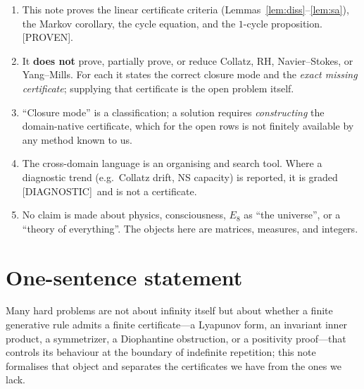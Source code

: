 \documentclass[11pt]{article}
\theoremstyle{definition}
\theoremstyle{plain}
\theoremstyle{remark}
\newcommand{\PROVEN}{\textcolor{green!45!black}{\textsf{[PROVEN]}}}
\newcommand{\DIAG}{\textcolor{blue!55!black}{\textsf{[DIAGNOSTIC]}}}
\begin{document}
\begin{enumerate}[leftmargin=1.6em]
\item This note proves the linear certificate criteria
(Lemmas~\ref{lem:diss}--\ref{lem:sa}), the Markov corollary, the cycle equation, and the
$1$-cycle proposition. \PROVEN.
\item It \textbf{does not} prove, partially prove, or reduce Collatz, RH, Navier--Stokes,
or Yang--Mills. For each it states the correct closure mode and the \emph{exact missing
certificate}; supplying that certificate is the open problem itself.
\item ``Closure mode'' is a classification; a solution requires \emph{constructing} the
domain-native certificate, which for the open rows is not finitely available by any
method known to us.
\item The cross-domain language is an organising and search tool. Where a diagnostic
trend (e.g.\ Collatz drift, NS capacity) is reported, it is graded \DIAG\ and is not a
certificate.
\item No claim is made about physics, consciousness, $E_8$ as ``the universe'', or a
``theory of everything''. The objects here are matrices, measures, and integers.
\end{enumerate}

\section*{One-sentence statement}
\noindent Many hard problems are not about infinity itself but about whether a finite
generative rule admits a finite certificate---a Lyapunov form, an invariant inner
product, a symmetrizer, a Diophantine obstruction, or a positivity proof---that controls
its behaviour at the boundary of indefinite repetition; this note formalises that object
and separates the certificates we have from the ones we lack.
\end{document}
